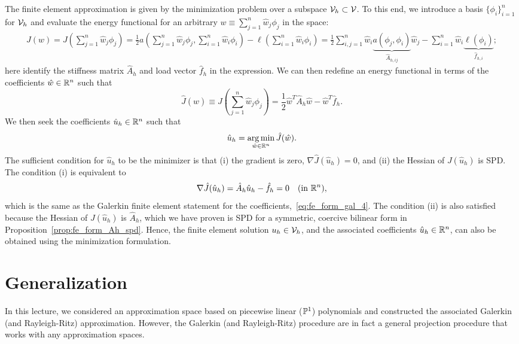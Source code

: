 The finite element approximation is given by the minimization problem over a subspace $\mathcal{V}_h \subset \mathcal{V}$. To this end, we introduce a basis $\{\phi_i\}_{i=1}^n$ for $\mathcal{V}_h$ and evaluate the energy functional for an arbitrary $w \equiv \sum_{j=1}^n \hat w_j \phi_j$ in the space:
\begin{align*}
  J(w) =  J(\sum_{j=1}^n \hat w_j \phi_j)
  = \frac{1}{2} a (\sum_{j=1}^n \hat w_j \phi_j, \sum_{i=1}^n \hat w_i \phi_i) - \ell(\sum_{i=1}^n \hat w_i \phi_i)
  = \frac{1}{2} \sum_{i,j=1}^n \hat w_i \underbrace{ a(\phi_j,\phi_i) }_{\hat A_{h,ij}} \hat w_j - \sum_{i=1}^n \hat w_i \underbrace{ \ell(\phi_i) }_{\hat f_{h,i}};
\end{align*}
here identify the stiffness matrix $\hat A_h$ and load vector $\hat f_h$ in the expression. We can then redefine an energy functional in terms of the coefficients $\hat w \in \mathbb{R}^n$ such that 
\begin{equation*}
  \hat J(\hat w) \equiv J(\sum_{j=1}^n \hat w_j \phi_j)
  = \frac{1}{2} \hat w^T \hat A_h \hat w - \hat w^T \hat f_h.
\end{equation*}
We then seek the coefficients $\hat u_h \in \mathbb{R}^n$ such that
\begin{equation*}
  \hat u_h = \operatorname*{arg\,min}_{\hat w \in \mathbb{R}^n} \hat J(\hat w).
\end{equation*}
The sufficient condition for $\hat u_h$ to be the minimizer is that (i) the gradient is zero, $\nabla \hat J(\hat u_h) = 0$, and (ii) the Hessian of $J(\hat u_h)$ is SPD.  The condition (i) is equivalent to
\begin{equation*}
  \nabla \hat J(\hat u_h) = \hat A_h \hat u_h - \hat f_h = 0 \quad (\text{in } \mathbb{R}^n),
\end{equation*}
which is the same as the Galerkin finite element statement for the coefficients,~\ref{eq:fe_form_gal_4}.  The condition (ii) is also satisfied because the Hessian of $J(\hat u_h)$ is $\hat A_h$, which we have proven is SPD for a symmetric, coercive bilinear form in Proposition~\eqref{prop:fe_form_Ah_spd}. Hence, the finite element solution $u_h \in \mathcal{V}_h$, and the associated coefficients $\hat u_h \in \mathbb{R}^n$, can also be obtained using the minimization formulation.

\section{Generalization}
In this lecture, we considered an approximation space based on piecewise linear ($\mathbb{P}^1$) polynomials and constructed the associated Galerkin (and Rayleigh-Ritz) approximation. However, the Galerkin (and Rayleigh-Ritz) procedure are in fact a general projection procedure that works with any approximation spaces.

